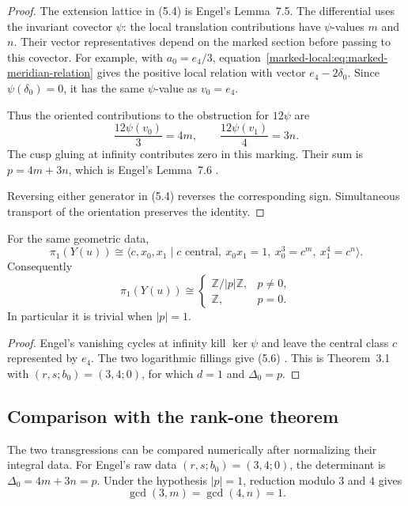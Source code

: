 \documentclass[11pt]{article}
\numberwithin{equation}{section}
\begin{document}
\begin{proof}
The extension lattice in (5.4) is Engel's Lemma~7.5. The differential
uses the invariant covector $\psi$: the local translation contributions
have $\psi$-values $m$ and $n$. Their vector representatives depend on
the marked section before passing to this covector. For example, with
$a_0=e_4/3$, equation~\eqref{marked-local:eq:marked-meridian-relation}
gives the positive local relation with vector $e_4-2\delta_0$.
Since $\psi(\delta_0)=0$, it has the same $\psi$-value as $v_0=e_4$.

Thus the oriented contributions to the obstruction for $12\psi$ are
\[
       \frac{12\psi(v_0)}3=4m,\qquad
       \frac{12\psi(v_1)}4=3n.                                   \tag{5.5}
\]
The cusp gluing at infinity contributes zero in this marking.  Their sum is
$p=4m+3n$, which is Engel's Lemma~7.6
\cite[pp.~20--21]{Engel}.

Reversing either generator in (5.4) reverses the
corresponding sign. Simultaneous transport of the orientation preserves the
identity.
\end{proof}

\begin{proposition}
For the same geometric data,
\[
 \pi_1(Y(u))\cong
 \langle c,x_0,x_1\mid c\text{ central},\ x_0x_1=1,
          \ x_0^3=c^m,\ x_1^4=c^n\rangle.                         \tag{5.6}
\]
Consequently
\[
 \pi_1(Y(u))\cong
 \begin{cases}
  \mathbb Z/|p|\mathbb Z,&p\ne0,\\
  \mathbb Z,&p=0.
 \end{cases}                                                       \tag{5.7}
\]
In particular it is trivial when $|p|=1$.
\end{proposition}

\begin{proof}
Engel's vanishing cycles at infinity kill $\ker\psi$ and leave the central
class $c$ represented by $e_4$.  The two logarithmic fillings give (5.6)
\cite[Proposition 6.1, pp.~15--16]{Engel}.  This is Theorem~3.1 with
$(r,s;b_0)=(3,4;0)$, for which $d=1$ and $\Delta_0=p$.
\end{proof}

\subsection*{Comparison with the rank-one theorem}

The two transgressions can be compared numerically after normalizing
their integral data. For Engel's raw data
$(r,s;b_0)=(3,4;0)$, the determinant is
$\Delta_0=4m+3n=p$. Under the hypothesis $|p|=1$, reduction modulo
$3$ and $4$ gives
\[
                  \gcd(3,m)=\gcd(4,n)=1.
\]
\end{document}
